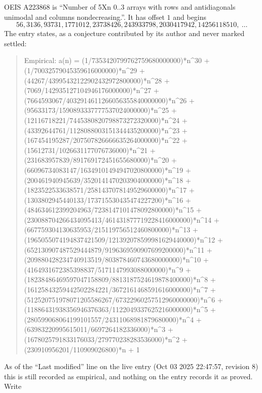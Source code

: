 \documentclass[11pt,a4paper]{article}
\theoremstyle{plain}
\theoremstyle{definition}
\begin{document}
OEIS A223868 is ``Number of 5Xn 0..3 arrays with rows and antidiagonals unimodal and columns nondecreasing.''. It has offset $1$ and begins
\[
56, 3136, 93731, 1771012, 23738426, 243933798, 2030417942, 14256118510,\ \dots
\]
The entry states, as a conjecture contributed by its author and never marked settled:
\begin{quote}\raggedright\small
Empirical: a(n) = (1/7353420799762759680000000)*n\^{}30 + (1/70032579045359616000000)*n\^{}29 + (44267/43995432122902432972800000)*n\^{}28 + (7069/142935127104946176000000)*n\^{}27 + (7664593067/4032914611266056355840000000)*n\^{}26 + (95633173/1590893337777537024000000)*n\^{}25 + (12116718221/7445380820798873272320000)*n\^{}24 + (43392644761/1128088003151344435200000)*n\^{}23 + (167454195287/207507826666635264000000)*n\^{}22 + (15612731/1026631177076736000)*n\^{}21 + (231683957839/891769172451655680000)*n\^{}20 + (66096734083147/16349101494947020800000)*n\^{}19 + (200461940945639/3520141470203904000000)*n\^{}18 + (1823522533638571/2581437078149529600000)*n\^{}17 + (1303802945440133/173715530435474227200)*n\^{}16 + (484634612399204963/7238147101478092800000)*n\^{}15 + (230088704266434095413/461431877719228416000000)*n\^{}14 + (667759304130635953/215119756512460800000)*n\^{}13 + (1965055074194837421509/121392078599981629440000)*n\^{}12 + (652130907487529444879/9196369590907699200000)*n\^{}11 + (209880428234740913519/803878460743680000000)*n\^{}10 + (4164931672385398837/5171147993088000000)*n\^{}9 + (18238486469597047158809/8813187524619878400000)*n\^{}8 + (16125843259442502284221/3672161468591616000000)*n\^{}7 + (512520751978071205586267/67322960257512960000000)*n\^{}6 + (11886431938356946376363/1122049337625216000000)*n\^{}5 + (280599068064199101557/24311068981879680000)*n\^{}4 + (63983220995615011/6697264182336000)*n\^{}3 + (1678025791833176033/279770238283536000)*n\^{}2 + (230910956201/110909026800)*n + 1
\end{quote}
As of the ``Last modified'' line on the live entry (Oct 03 2025 22:47:57, revision 8) this is still
recorded as empirical, and nothing on the entry records it as proved. Write
\end{document}
